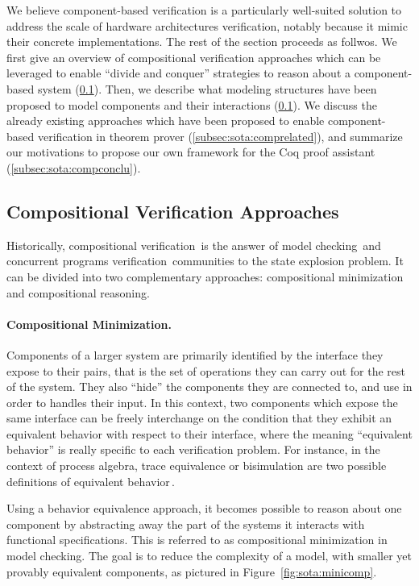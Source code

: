 We believe component-based verification is a particularly well-suited solution
to address the scale of hardware architectures verification, notably because it
mimic their concrete implementations.
%
The rest of the section proceeds as follwos.
%
We first give an overview of compositional verification approaches which can be
leveraged to enable ``divide and conquer'' strategies to reason about a
component-based system (\ref{subsec:sota:compverif}).
%
Then, we describe what modeling structures have been proposed to model
components and their interactions (\ref{subsec:sota:compverif}).
%
We discuss the already existing approaches which have been proposed to enable
component-based verification in theorem prover (\ref{subsec:sota:comprelated}),
and summarize our motivations to propose our own framework for the Coq proof
assistant (\ref{subsec:sota:compconclu}).

\subsection{Compositional Verification Approaches}
\label{subsec:sota:compverif}

Historically, compositional verification\,\cite{peng1998survey} is the answer of
model checking\,\cite{mcmillan1989compositional} and concurrent programs
verification\,\cite{jones1983tentative} communities to the state explosion
problem.
%
It can be divided into two complementary approaches: compositional minimization
and compositional reasoning.

\paragraph{Compositional Minimization.}
%
Components of a larger system are primarily identified by the interface they
expose to their pairs, that is the set of operations they can carry out for the
rest of the system.
%
They also ``hide'' the components they are connected to, and use in order to
handles their input.
%
In this context, two components which expose the same interface can be freely
interchange on the condition that they exhibit an equivalent behavior with
respect to their interface, where the meaning ``equivalent behavior'' is really
specific to each verification problem.
%
For instance, in the context of process algebra, trace equivalence or
bisimulation are two possible definitions of equivalent
behavior\,\cite{fokkink2013pa}.

Using a behavior equivalence approach, it becomes possible to reason about one
component by abstracting away the part of the systems it interacts with
functional specifications.
%
This is referred to as compositional minimization in model checking.
%
The goal is to reduce the complexity of a model, with smaller yet provably
equivalent components, as pictured in Figure~\ref{fig:sota:minicomp}.
%


